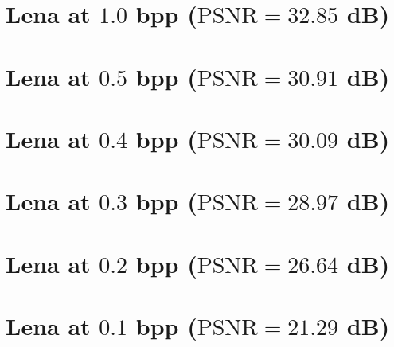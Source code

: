 \section*{Lena at $1.0$ bpp ($\text{PSNR}=32.85$ dB)}
\begin{center}
\end{center}

\section*{Lena at $0.5$ bpp ($\text{PSNR}=30.91$ dB)}
\begin{center}
\end{center}

\section*{Lena at $0.4$ bpp ($\text{PSNR}=30.09$ dB)}
\begin{center}
\end{center}

\section*{Lena at $0.3$ bpp ($\text{PSNR}=28.97$ dB)}
\begin{center}
\end{center}

\section*{Lena at $0.2$ bpp ($\text{PSNR}=26.64$ dB)}
\begin{center}
\end{center}

\section*{Lena at $0.1$ bpp ($\text{PSNR}=21.29$ dB)}
\begin{center}
\end{center}

